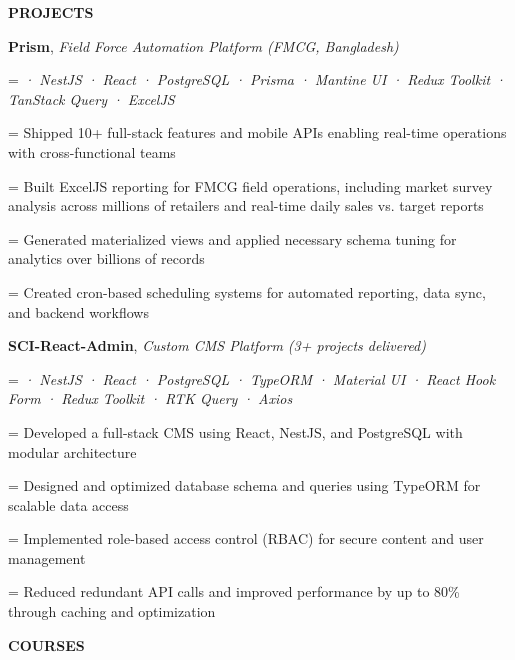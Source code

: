 \documentclass[a4paper]{article}
\newcommand{\bodyfont}{%
  \fontsize{11pt}{13pt}\selectfont
}
\newcommand{\sectionfont}{%
  \fontsize{12pt}{14pt}\selectfont\bfseries
}
\newlength{\secondaryindent}
\newlength{\listindent}
\newcommand{\sectiontitle}[1]{%
  \par
  \vspace{14pt}
  {\sectionfont #1}\par
  \vspace{6pt}
}
\newlength{\bulletgap}
\newcommand{\resumebullet}[1]{%
  \begingroup
  \leftskip=\listindent
  \parindent=0pt
  \noindent
  \llap{%
    \raisebox{0.15ex}{%
      \fontsize{7}{7}\selectfont -
    }%
    \hspace{6pt}%
  }%
  #1\par
  \endgroup
  \vspace{\bulletgap}%
}
\newcommand{\secondaryline}[1]{%
  \par
  \begingroup
  \leftskip=\secondaryindent
  \noindent
  #1\par
  \endgroup
}
\newcommand{\projecttitle}[2]{%
  \textbf{#1}, \textit{#2}\par
}
\newcommand{\projecttech}[1]{%
  \secondaryline{\textit{#1}}%
}
\begin{document}
\bodyfont


\sectiontitle{PROJECTS}

\projecttitle
{Prism}
{Field Force Automation Platform (FMCG, Bangladesh)}

\projecttech{· NestJS · React · PostgreSQL · Prisma · Mantine UI · Redux Toolkit · TanStack Query · ExcelJS}

\vspace{7.64pt}

\resumebullet{Shipped 10+ full-stack features and mobile APIs enabling real-time operations with cross-functional teams}

\resumebullet{Built ExcelJS reporting for FMCG field operations, including market survey analysis across millions of retailers and real-time daily sales vs. target reports}

\resumebullet{Generated materialized views and applied necessary schema tuning for analytics over billions of records}

\resumebullet{Created cron-based scheduling systems for automated reporting, data sync, and backend workflows}

\vspace{6pt}

\projecttitle
{SCI-React-Admin}
{Custom CMS Platform (3+ projects delivered)}

\projecttech{· NestJS · React · PostgreSQL · TypeORM · Material UI · React Hook Form · Redux Toolkit · RTK Query · Axios}

\vspace{7.64pt}

\resumebullet{Developed a full-stack CMS using React, NestJS, and PostgreSQL with modular architecture}

\resumebullet{Designed and optimized database schema and queries using TypeORM for scalable data access}

\resumebullet{Implemented role-based access control (RBAC) for secure content and user management}

\resumebullet{Reduced redundant API calls and improved performance by up to 80\% through caching and optimization}


\sectiontitle{COURSES}
\end{document}
